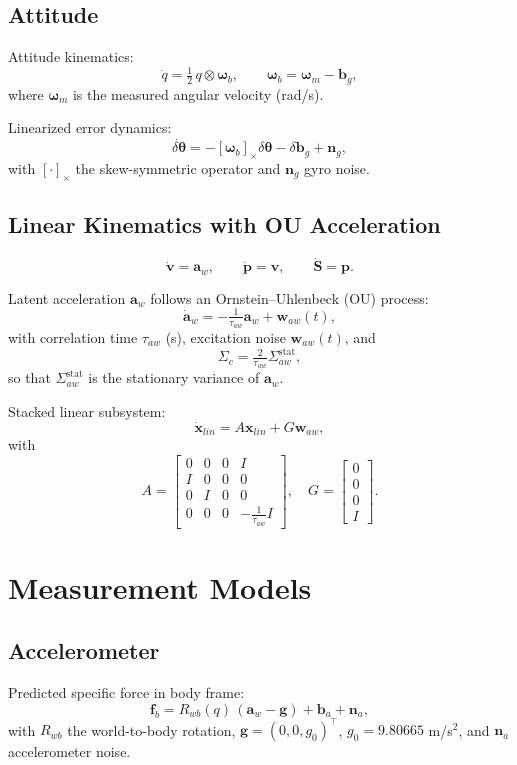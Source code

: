 \documentclass[11pt]{article}
\begin{document}
\subsection{Attitude}
Attitude kinematics:
\[
\dot q = \tfrac{1}{2}\, q \otimes \bm\omega_b, \qquad 
\bm\omega_b = \bm\omega_m - \bm{b}_g,
\]
where $\bm\omega_m$ is the measured angular velocity (rad/s).

Linearized error dynamics:
\[
\dot{\delta\bm\theta} = -[\bm\omega_b]_\times \delta\bm\theta - \delta\bm b_g + \bm{n}_g,
\]
with $[\cdot]_\times$ the skew-symmetric operator and $\bm n_g$ gyro noise.

\subsection{Linear Kinematics with OU Acceleration}
\[
\dot{\bm v} = \bm a_w, \qquad
\dot{\bm p} = \bm v, \qquad
\dot{\bm S} = \bm p.
\]

Latent acceleration $\bm a_w$ follows an Ornstein--Uhlenbeck (OU) process:
\[
\dot{\bm a}_w = -\tfrac{1}{\tau_{aw}} \bm a_w + \bm w_{aw}(t),
\]
with correlation time $\tau_{aw}$ (s), excitation noise $\bm w_{aw}(t)$, and
\[
\Sigma_c = \tfrac{2}{\tau_{aw}} \Sigma_{aw}^{\mathrm{stat}},
\]
so that $\Sigma_{aw}^{\mathrm{stat}}$ is the stationary variance of $\bm a_w$.

Stacked linear subsystem:
\[
\dot{\bm x}_{lin} = A \bm x_{lin} + G \bm w_{aw},
\]
with
\[
A =
\begin{bmatrix}
0 & 0 & 0 & I\\
I & 0 & 0 & 0\\
0 & I & 0 & 0\\
0 & 0 & 0 & -\tfrac{1}{\tau_{aw}}I
\end{bmatrix}, \quad
G = \begin{bmatrix}0\\0\\0\\I\end{bmatrix}.
\]

\section{Measurement Models}
\subsection{Accelerometer}
Predicted specific force in body frame:
\[
\bm f_b = R_{wb}(q)\,(\bm a_w - \bm g) + \bm b_a + \bm n_a,
\]
with $R_{wb}$ the world-to-body rotation, $\bm g=(0,0,g_0)^\top$, 
$g_0=9.80665$ m/s$^2$, and $\bm n_a$ accelerometer noise.
\end{document}
